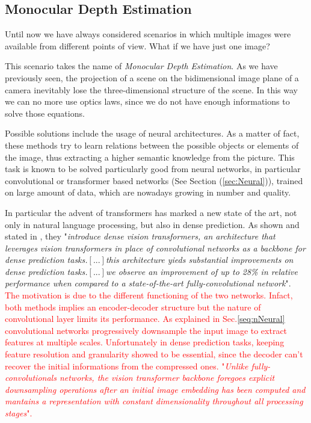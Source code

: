 \subsection{Monocular Depth Estimation}
Until now we have always considered scenarios in which multiple images were 
available from different points of view. What if we have just one image?

This scenario takes the name of \textit{Monocular Depth Estimation}. As we have previously seen,
the projection of a scene on the bidimensional image plane of a camera inevitably lose the three-dimensional
structure of the scene. In this way we can no more use optics laws, since we do not have enough informations to 
solve those equations.

Possible solutions include the usage of neural architectures. As a matter of fact, these methods try to learn relations
between the possible objects or elements of the image, thus extracting a higher semantic knowledge from the picture.
This task is known to be solved particularly good from neural networks, in particular convolutional or transformer based 
networks (See Section (\ref{sec:Neural})), trained on large amount of data, which are nowadays growing in number and quality.

In particular the advent of transformers has marked a new state of the art, not only in natural language processing, but also in dense prediction.
As shown and stated in \cite{Ranftl2021}, they "\textit{introduce dense vision transformers, an architecture that leverages vision transformers 
in place of convolutional networks as a backbone for dense prediction tasks.$[...]$this architecture yieds substantial improvements
on dense prediction tasks.$[...]$we observe an improvement of up to 28\% in relative performance when compared to a state-of-the-art 
fully-convolutional network}". \textcolor{red}{The motivation is due to the different functioning of the two networks. Infact, both methods
implies an encoder-decoder structure but the nature of convolutional layer limits its performance. As explained in Sec.\ref{seq:nNeural}
convolutional networks progressively downsample the input image to extract features at multiple scales. Unfortunately in 
dense prediction tasks, keeping feature resolution and granularity showed to be essential, since the decoder can't recover
the initial informations from the compressed ones. "\textit{Unlike fully-convolutionals networks, the vision transformer
backbone foregoes explicit downsampling operations after an initial image embedding has been computed
and mantains a representation with constant dimensionality throughout all processing stages}"\cite{Ranftl2021}.
}

